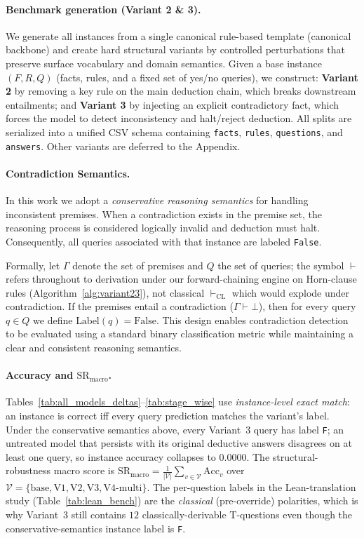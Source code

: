 \documentclass{article}
\begin{document}
\paragraph{Benchmark generation (Variant 2 \& 3).}
We generate all instances from a single canonical rule-based template (canonical backbone) and create
hard structural variants by controlled perturbations that preserve surface vocabulary and domain semantics.
Given a base instance $(F,R,Q)$ (facts, rules, and a fixed set of yes/no queries), we construct:
\textbf{Variant 2} by removing a key rule on the main deduction chain, which breaks downstream entailments;
and \textbf{Variant 3} by injecting an explicit contradictory fact, which forces the model to detect inconsistency and halt/reject deduction.
All splits are serialized into a unified CSV schema containing \texttt{facts}, \texttt{rules}, \texttt{questions}, and \texttt{answers}.
Other variants are deferred to the Appendix.

\paragraph{Contradiction Semantics.}
In this work we adopt a \textit{conservative reasoning semantics} for
handling inconsistent premises. When a contradiction exists in the
premise set, the reasoning process is considered logically invalid and
deduction must halt. Consequently, all queries associated with that
instance are labeled \texttt{False}.

Formally, let $\Gamma$ denote the set of premises and $Q$ the set of
queries; the symbol $\vdash$ refers throughout to derivation under our
forward-chaining engine on Horn-clause rules (Algorithm~\ref{alg:variant23}),
not classical $\vdash_{\text{CL}}$ which would explode under contradiction.
If the premises entail a contradiction ($\Gamma \vdash \bot$),
then for every query $q \in Q$ we define
$\text{Label}(q) = \text{False}$.
This design enables contradiction detection to be evaluated using a
standard binary classification metric while maintaining a clear and
consistent reasoning semantics.

\paragraph{Accuracy and $\mathrm{SR}_{\text{macro}}$.}
Tables~\ref{tab:all_models_deltas}--\ref{tab:stage_wise} use \emph{instance-level exact match}: an instance is correct iff every query prediction matches the variant's label. Under the conservative semantics above, every Variant~3 query has label \texttt{F}; an untreated model that persists with its original deductive answers disagrees on at least one query, so instance accuracy collapses to $0.0000$. The structural-robustness macro score is $\mathrm{SR}_{\text{macro}} = \tfrac{1}{|\mathcal{V}|} \sum_{v \in \mathcal{V}} \mathrm{Acc}_v$ over $\mathcal{V} = \{\text{base}, \text{V1}, \text{V2}, \text{V3}, \text{V4-multi}\}$. The per-question labels in the Lean-translation study (Table~\ref{tab:lean_bench}) are the \emph{classical} (pre-override) polarities, which is why Variant~3 still contains $12$ classically-derivable T-questions even though the conservative-semantics instance label is \texttt{F}.
\end{document}
